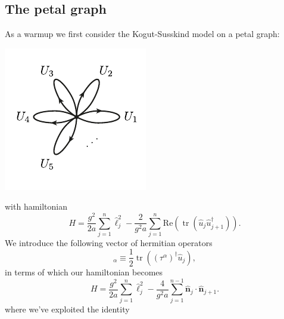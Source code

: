 \documentclass[12pt]{amsart}
\newcommand{\tr}{\operatorname{tr}}
\theoremstyle{definition}
\theoremstyle{remark}
\numberwithin{equation}{section}
\begin{document}
\subsection{The petal graph}
As a warmup we first consider the Kogut-Susskind model on a petal graph:
\begin{center}
	\includegraphics{petal2.pdf}
\end{center}
with hamiltonian
\begin{equation}
	H = \frac{g^2}{2 a} \sum_{j=1}^n \widehat{\ell}^2_j - \frac{2}{g^2 a} \sum_{j=1}^n \text{Re}(\tr(\widehat{u}_j\widehat{u}_{j+1}^\dag)).
\end{equation}
We introduce the following vector of hermitian operators
\begin{equation}
	[\widehat{\mathbf{n}}_j]_\alpha \equiv \frac12\tr((\tau^\alpha)^\dag \widehat{u}_j),
\end{equation}
in terms of which our hamiltonian becomes 
\begin{equation}
	H = \frac{g^2}{2 a} \sum_{j=1}^n \widehat{\ell}^2_j - \frac{4}{g^2 a} \sum_{j=1}^{n-1} \widehat{\mathbf{n}}_j\cdot \widehat{\mathbf{n}}_{j+1}.
\end{equation}
where we've exploited the identity
\end{document}

